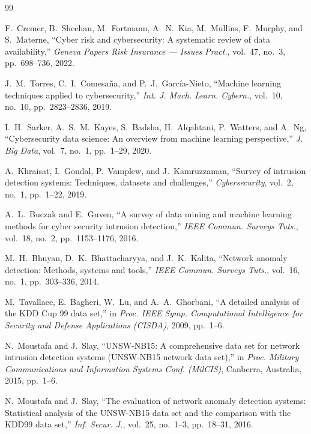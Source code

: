 \documentclass[11pt,a4paper]{article}
\begin{document}
\begin{thebibliography}{99}

 F.~Cremer, B.~Sheehan, M.~Fortmann, A.~N.~Kia, M.~Mullins,
F.~Murphy, and S.~Materne, ``Cyber risk and cybersecurity: A systematic review
of data availability,'' \emph{Geneva Papers Risk Insurance --- Issues Pract.},
vol.~47, no.~3, pp.~698--736, 2022.

 J.~M.~Torres, C.~I.~Comesa\~na, and P.~J.~Garc\'ia-Nieto,
``Machine learning techniques applied to cybersecurity,'' \emph{Int. J. Mach.
Learn. Cybern.}, vol.~10, no.~10, pp.~2823--2836, 2019.

 I.~H.~Sarker, A.~S.~M.~Kayes, S.~Badsha, H.~Alqahtani,
P.~Watters, and A.~Ng, ``Cybersecurity data science: An overview from machine
learning perspective,'' \emph{J. Big Data}, vol.~7, no.~1, pp.~1--29, 2020.

 A.~Khraisat, I.~Gondal, P.~Vamplew, and J.~Kamruzzaman,
``Survey of intrusion detection systems: Techniques, datasets and challenges,''
\emph{Cybersecurity}, vol.~2, no.~1, pp.~1--22, 2019.

 A.~L.~Buczak and E.~Guven, ``A survey of data mining and
machine learning methods for cyber security intrusion detection,'' \emph{IEEE
Commun. Surveys Tuts.}, vol.~18, no.~2, pp.~1153--1176, 2016.

 M.~H.~Bhuyan, D.~K.~Bhattacharyya, and J.~K.~Kalita, ``Network
anomaly detection: Methods, systems and tools,'' \emph{IEEE Commun. Surveys
Tuts.}, vol.~16, no.~1, pp.~303--336, 2014.

 M.~Tavallaee, E.~Bagheri, W.~Lu, and A.~A.~Ghorbani, ``A detailed
analysis of the KDD Cup 99 data set,'' in \emph{Proc. IEEE Symp. Computational
Intelligence for Security and Defense Applications (CISDA)}, 2009, pp.~1--6.

 N.~Moustafa and J.~Slay, ``UNSW-NB15: A comprehensive data set
for network intrusion detection systems (UNSW-NB15 network data set),'' in
\emph{Proc. Military Communications and Information Systems Conf. (MilCIS)},
Canberra, Australia, 2015, pp.~1--6.

 N.~Moustafa and J.~Slay, ``The evaluation of network anomaly
detection systems: Statistical analysis of the UNSW-NB15 data set and the
comparison with the KDD99 data set,'' \emph{Inf. Secur. J.}, vol.~25, no.~1--3,
pp.~18--31, 2016.


\end{thebibliography}
\end{document}

